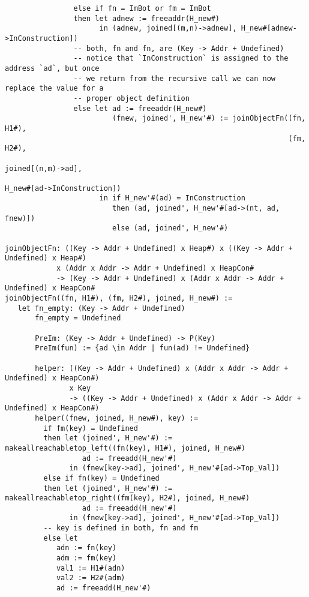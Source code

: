 \begin{verbatim}
                else if fn = ImBot or fm = ImBot
                then let adnew := freeaddr(H_new#)
                      in (adnew, joined[(m,n)->adnew], H_new#[adnew->InConstruction])
                -- both, fn and fn, are (Key -> Addr + Undefined)
                -- notice that `InConstruction` is assigned to the address `ad`, but once
                -- we return from the recursive call we can now replace the value for a
                -- proper object definition
                else let ad := freeaddr(H_new#)
                         (fnew, joined', H_new'#) := joinObjectFn((fn, H1#),
                                                                  (fm, H2#),
                                                                  joined[(n,m)->ad],
                                                                  H_new#[ad->InConstruction])
                      in if H_new'#(ad) = InConstruction
                         then (ad, joined', H_new'#[ad->(nt, ad, fnew)])
                         else (ad, joined', H_new'#)

joinObjectFn: ((Key -> Addr + Undefined) x Heap#) x ((Key -> Addr + Undefined) x Heap#)
            x (Addr x Addr -> Addr + Undefined) x HeapCon#
            -> (Key -> Addr + Undefined) x (Addr x Addr -> Addr + Undefined) x HeapCon#
joinObjectFn((fn, H1#), (fm, H2#), joined, H_new#) :=
   let fn_empty: (Key -> Addr + Undefined)
       fn_empty = Undefined

       PreIm: (Key -> Addr + Undefined) -> P(Key)
       PreIm(fun) := {ad \in Addr | fun(ad) != Undefined}

       helper: ((Key -> Addr + Undefined) x (Addr x Addr -> Addr + Undefined) x HeapCon#)
               x Key
               -> ((Key -> Addr + Undefined) x (Addr x Addr -> Addr + Undefined) x HeapCon#)
       helper((fnew, joined, H_new#), key) :=
         if fm(key) = Undefined
         then let (joined', H_new'#) := makeallreachabletop_left((fn(key), H1#), joined, H_new#)
                  ad := freeadd(H_new'#)
               in (fnew[key->ad], joined', H_new'#[ad->Top_Val])
         else if fn(key) = Undefined
         then let (joined', H_new'#) := makeallreachabletop_right((fm(key), H2#), joined, H_new#)
                  ad := freeadd(H_new'#)
               in (fnew[key->ad], joined', H_new'#[ad->Top_Val])
         -- key is defined in both, fn and fm
         else let
            adn := fn(key)
            adm := fm(key)
            val1 := H1#(adn)
            val2 := H2#(adm)
            ad := freeadd(H_new'#)


\end{verbatim}
